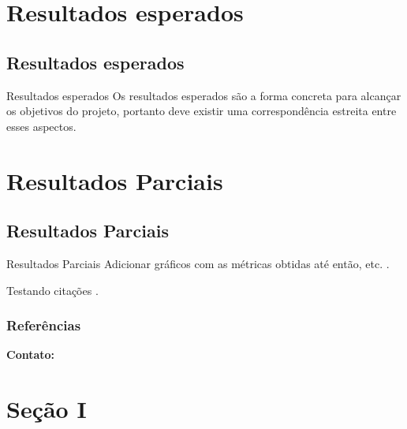 \documentclass{libs/ufrb_format}
\begin{document}
\section{Resultados esperados}
\subsection{Resultados esperados}
\begin{frame}{Resultados esperados}
    Os resultados esperados são a forma concreta para alcançar os objetivos do projeto, portanto deve existir uma correspondência estreita entre esses aspectos.
\end{frame}

\section{Resultados Parciais}
\subsection{Resultados Parciais}
\begin{frame}{Resultados Parciais}
    Adicionar gráficos com as métricas obtidas até então, etc. \cite{zhang2010new}.

    Testando citações \cite{einstein} \cite{burkov2019hundred}. 
\end{frame}



\begin{frame}[allowframebreaks]
    \frametitle{Referências}
    \printbibliography
\end{frame}

\begin{frame}{}
    \centering
    \huge{\textbf{}}
    
    \vspace{1cm}
    
    \Large{\textbf{Contato:}}
    \newline
    \vspace*{0.5cm}
    \large{}
\end{frame}

\section{Seção I}
\end{document}
